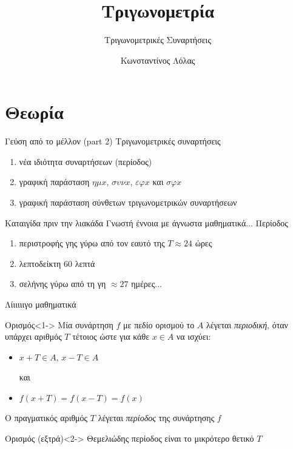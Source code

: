 \documentclass[greek]{beamer}
\title{Τριγωνομετρία}
\subtitle{Τριγωνομετρικές Συναρτήσεις}
\author[Λόλας]{Κωνσταντίνος Λόλας}
\date{}
\begin{document}
\begin{frame}
 \titlepage
\end{frame}

\section{Θεωρία}
\begin{frame}{Γεύση από το μέλλον (part 2)}
 Τριγωνομετρικές συναρτήσεις
 \begin{enumerate}
  \item<1-> νέα ιδιότητα συναρτήσεων (περίοδος)
  \item<2-> γραφική παράσταση $ημx$, $συνx$, $εφx$ και $σφx$
  \item<3-> γραφική παράσταση σύνθετων τριγωνομετρικών συναρτήσεων
 \end{enumerate}
\end{frame}

\begin{frame}{Καταιγίδα πριν την λιακάδα}
 Γνωστή έννοια με άγνωστα μαθηματικά... Περίοδος
 \begin{enumerate}
  \item<1-> περιστροφής γης γύρω από τον εαυτό της $T\approx 24$ ώρες
  \item<2-> λεπτοδείκτη $60$ λεπτά
  \item<3-> σελήνης γύρω από τη γη $\approx 27$ ημέρες...
 \end{enumerate}
\end{frame}

\begin{frame}{Λίιιιιιγο μαθηματικά}
 \begin{block}{Ορισμός}<1->
  Μία συνάρτηση $f$ με πεδίο ορισμού το $Α$ λέγεται \emph{περιοδική}, όταν υπάρχει αριθμός $Τ$ τέτοιος ώστε για κάθε $x\in Α$ να ισχύει:
  \begin{itemize}
   \item $x+Τ\in Α$, $x-Τ\in Α$

         και

   \item $f(x+Τ)=f(x-Τ)=f(x)$
  \end{itemize}
  Ο πραγματικός αριθμός $Τ$ λέγεται \emph{περίοδος} της συνάρτησης $f$
 \end{block}

 \begin{block}{Ορισμός (εξτρά)}<2->
  Θεμελιώδης περίοδος είναι το μικρότερο θετικό $Τ$
 \end{block}

\end{frame}
\end{document}
